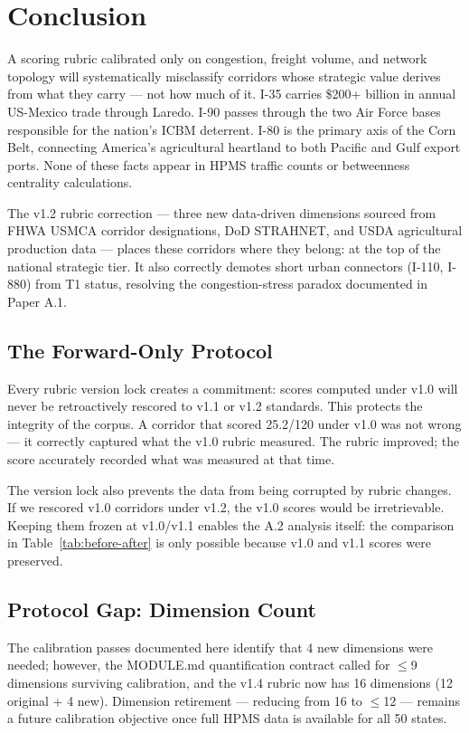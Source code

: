 \section{Conclusion}

A scoring rubric calibrated only on congestion, freight volume, and network topology will systematically misclassify corridors whose strategic value derives from what they carry --- not how much of it. I-35 carries \$200+ billion in annual US-Mexico trade through Laredo. I-90 passes through the two Air Force bases responsible for the nation's ICBM deterrent. I-80 is the primary axis of the Corn Belt, connecting America's agricultural heartland to both Pacific and Gulf export ports. None of these facts appear in HPMS traffic counts or betweenness centrality calculations.

The v1.2 rubric correction --- three new data-driven dimensions sourced from FHWA USMCA corridor designations, DoD STRAHNET, and USDA agricultural production data --- places these corridors where they belong: at the top of the national strategic tier. It also correctly demotes short urban connectors (I-110, I-880) from T1 status, resolving the congestion-stress paradox documented in Paper A.1.

\subsection*{The Forward-Only Protocol}

Every rubric version lock creates a commitment: scores computed under v1.0 will never be retroactively rescored to v1.1 or v1.2 standards. This protects the integrity of the corpus. A corridor that scored 25.2/120 under v1.0 was not wrong --- it correctly captured what the v1.0 rubric measured. The rubric improved; the score accurately recorded what was measured at that time.

The version lock also prevents the data from being corrupted by rubric changes. If we rescored v1.0 corridors under v1.2, the v1.0 scores would be irretrievable. Keeping them frozen at v1.0/v1.1 enables the A.2 analysis itself: the comparison in Table~\ref{tab:before-after} is only possible because v1.0 and v1.1 scores were preserved.

\subsection*{Protocol Gap: Dimension Count}

The calibration passes documented here identify that 4 new dimensions were needed; however, the MODULE.md quantification contract called for $\leq$9 dimensions surviving calibration, and the v1.4 rubric now has 16 dimensions (12 original + 4 new). Dimension retirement --- reducing from 16 to $\leq$12 --- remains a future calibration objective once full HPMS data is available for all 50 states.

